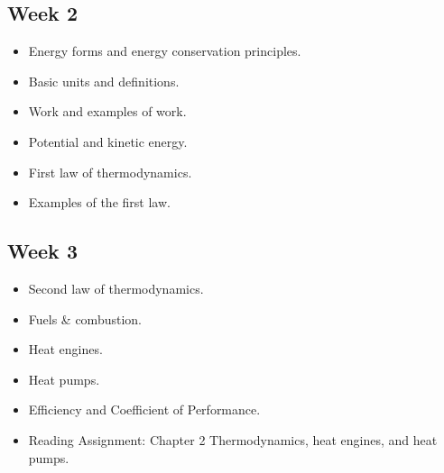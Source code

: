 \documentclass[letterpaper,10pt,english]{jupyterBook}
\begin{document}
\subsection{Week 2}
\label{\detokenize{Syllabus:week-2}}\begin{itemize}
\item {} 
\sphinxAtStartPar
Energy forms and energy conservation principles.

\item {} 
\sphinxAtStartPar
Basic units and definitions.

\item {} 
\sphinxAtStartPar
Work and examples of work.

\item {} 
\sphinxAtStartPar
Potential and kinetic energy.

\item {} 
\sphinxAtStartPar
First law of thermodynamics.

\item {} 
\sphinxAtStartPar
Examples of the first law.

\end{itemize}


\subsection{Week 3}
\label{\detokenize{Syllabus:week-3}}\begin{itemize}
\item {} 
\sphinxAtStartPar
Second law of thermodynamics.

\item {} 
\sphinxAtStartPar
Fuels \& combustion.

\item {} 
\sphinxAtStartPar
Heat engines.

\item {} 
\sphinxAtStartPar
Heat pumps.

\item {} 
\sphinxAtStartPar
Efficiency and Coefficient of Performance.

\item {} 
\sphinxAtStartPar
Reading Assignment: Chapter 2 \sphinxhyphen{} Thermodynamics, heat engines, and
heat pumps.

\end{itemize}
\end{document}
